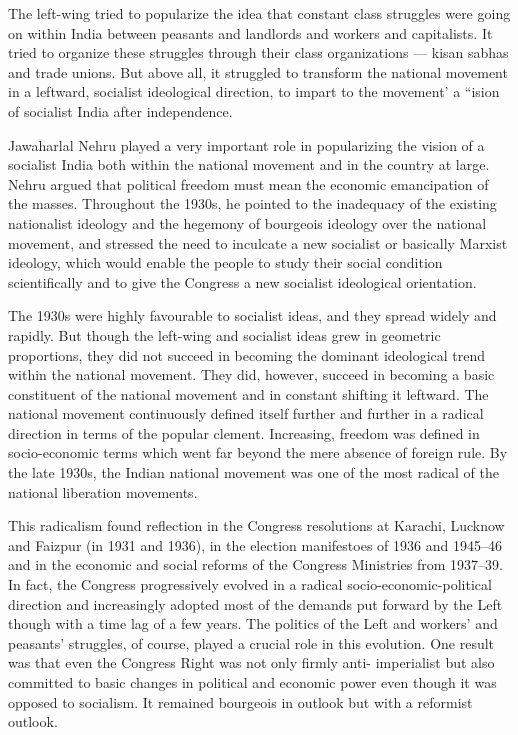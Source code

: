 The left-wing tried to popularize the idea that constant class struggles were going on within India between peasants and landlords and workers and capitalists. It tried to organize these struggles through their class organizations --- kisan sabhas and trade unions. But above all, it struggled to transform the national movement in a leftward, socialist ideological direction, to impart to the movement' a ``ision of socialist India after independence.

Jawaharlal Nehru played a very important role in popularizing the vision of a socialist India both within the national movement and in the country at large. Nehru argued that political freedom must mean the economic emancipation of the masses. Throughout the 1930s, he pointed to the inadequacy of the existing nationalist ideology and the hegemony of bourgeois ideology over the national movement, and stressed the need to inculcate a new socialist or basically Marxist ideology, which would enable the people to study their social condition scientifically and to give the Congress a new socialist ideological orientation.

The 1930s were highly favourable to socialist ideas, and they spread widely and rapidly. But though the left-wing and socialist ideas grew in geometric proportions, they did not succeed in becoming the dominant ideological trend within the national movement. They did, however, succeed in becoming a basic constituent of the national movement and in constant shifting it leftward. The national movement continuously defined itself further and further in a radical direction in terms of the popular clement. Increasing, freedom was defined in socio-economic terms which went far beyond the mere absence of foreign rule. By the late 1930s, the Indian national movement was one of the most radical of the national liberation movements.

This radicalism found reflection in the Congress resolutions at Karachi, Lucknow and Faizpur (in 1931 and 1936), in the election manifestoes of 1936 and 1945--46 and in the economic and social reforms of the Congress Ministries from 1937--39. In fact, the Congress progressively evolved in a radical socio-economic-political direction and increasingly adopted most of the demands put forward by the Left though with a time lag of a few years. The politics of the Left and workers' and peasants' struggles, of course, played a crucial role in this evolution. One result was that even the Congress Right was not only firmly anti- imperialist but also committed to basic changes in political and economic power even though it was opposed to socialism. It remained bourgeois in outlook but with a reformist outlook.


